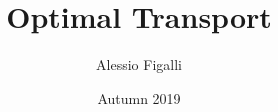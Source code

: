 \documentclass[oneside,leqno,11pt]{amsart}
\numberwithin{equation}{section}
\begin{document}
\title{Optimal Transport}
\author{Alessio Figalli}
\date{Autumn 2019}

\maketitle


\end{document}
